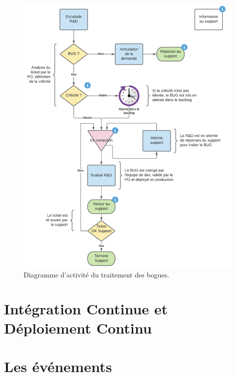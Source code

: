 \begin{appendices}
    \begin{figure}[ht]
        \centering
        \includegraphics[width=\textwidth]{img/lifecycle-of-bugs}
        \caption{Diagramme d'activité du traitement des bogues.}
        \label{fig:lifecycle-of-bugs}
    \end{figure}

    \section{Intégration Continue et Déploiement Continu}\label{sec-a:ci-cd}


    \section{Les événements}


\end{appendices}
